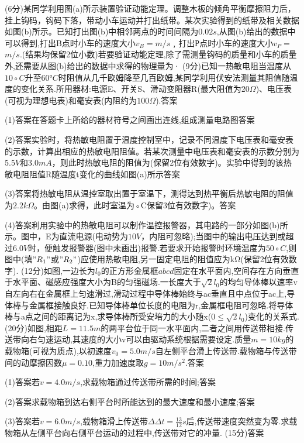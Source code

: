 \question[6] (6分)某同学利用图(a)所示装置验证动能定理。调整木板的倾角平衡摩擦阻力后，挂上钩码，钩码下落，带动小车运动并打出纸带。某次实验得到的纸带及相关数据如图(b)所示。已知打出图(b)中相邻两点的时间间隔为$0.02s$,从图(b)给出的数据中可以得到,打出B点时小车的速度大小$v_B=$\key{}$m/s﹐$打出Р点时小车的速度大小$v_P=$\key{}$m/s.$(结果均保留2位小数)若要验证动能定理,除了需测量钩码的质量和小车的质量外,还需要从图(b)给出的数据中求得的物理量为\key{}·
\question[6] (9分)已知一热敏电阻当温度从$10∘C$升至$60°C$时阻值从几千欧姆降至几百欧姆,某同学利用伏安法测量其阻值随温度的变化关系.所用器材:电源E、开关S、滑动变阻器R(最大阻值为$20Ω$)、电压表(可视为理想电表)和毫安表(内阻约为$100Ω$).答案

(1)答案在答题卡上所给的器材符号之间画出连线,组成测量电路图答案

(2)答案实验时，将热敏电阻置于温度控制室中，记录不同温度下电压表和毫安表的示数，计算出相应的热敏电阳阻值。若某次测量中电压表和毫安表的示数分别为$5.5V$和$3.0mA，$则此时热敏电阻的阻值为\key{}(保留2位有效数字)。实验中得到的该热敏电阻阻值R随温度t变化的曲线如图(a)所示答案

(3)答案将热敏电阻从温控室取出置于室温下，测得达到热平衡后热敏电阻的阻值为$2.2kΩ$。由图(a)求得，此时室温为\key{}◦C保留3位有效数字)。答案

(4)答案利用实验中的热敏电阻可以制作温控报警器，其电路的一部分如图(b)所示。图中，E为直流电源(电动势为$10V，$内阻可忽略);当图中的输出电压达到或超过$6.0V$时，便触发报警器(图中未画出)报警.若要求开始报警时环境温度为$50∘C$,则图中\key{}(填$"R_1"$或$"R_2"$)应使用热敏电阻,另一固定电阻的阻值应为\key{}kΩ(保留2位有效数字).
\question[6] (12分)如图,一边长为$l_0$的正方形金属框$abcd$固定在水平面内,空间存在方向垂直于水平面、磁感应强度大小为B的匀强磁场.一长度大于$\sqrt{2}l_{0}$的均匀导体棒以速率v自左向右在金属框上匀速滑过,滑动过程中导体棒始终与ac垂直且中点位于ac上,导体棒与金属框接触良好.已知导体棒单位长度的电阻为r,金属框电阻可忽略.将导体棒与a点之间的距离记为x,求导体棒所受安培力的大小随x($0\leqslant\sqrt{2}l_{0}$)变化的关系式.
\question[6] (20分)如图,相距$L=11.5m$的两平台位于同一水平面内,二者之间用传送带相接.传送带向右匀速运动,其速度的大小v可以由驱动系统根据需要设定.质量$m=10kg$的载物箱(可视为质点),以初速度$v_0=5.0m/s$自左侧平台滑上传送带.载物箱与传送带间的动摩擦因数$μ=0.10$,重力加速度取$g=10m/s^2.$答案

(1)答案若$v=4.0m/s$,求载物箱通过传送带所需的时间;答案

(2)答案求载物箱到达右侧平台时所能达到的最大速度和最小速度;答案

(3)答案若$v=6.0m/s$,载物箱滑上传送带$Δ\Delta t=\frac{13}{12}s$后,传送带速度突然变为零.求载物箱从左侧平台向右侧平台运动的过程中,传送带对它的冲量.
\question[6] [物理——选修$3–3$](15分)答案

